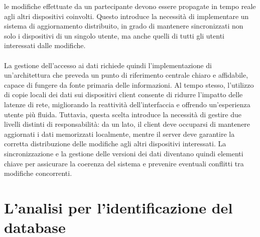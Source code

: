 le modifiche effettuate da un partecipante devono essere propagate
in tempo reale agli altri dispositivi coinvolti.
Questo introduce la necessità di implementare un sistema di aggiornamento distribuito,
in grado di mantenere sincronizzati non solo i dispositivi di un singolo utente,
ma anche quelli di tutti gli utenti interessati dalle modifiche.\\
\\
La gestione dell’accesso ai dati richiede quindi l’implementazione di un’architettura che preveda
un punto di riferimento centrale chiaro e affidabile,
capace di fungere da fonte primaria delle informazioni.
Al tempo stesso, l’utilizzo di copie locali dei dati sui dispositivi client
consente di ridurre l’impatto delle latenze di rete,
migliorando la reattività dell’interfaccia e offrendo un’esperienza utente più fluida.
Tuttavia, questa scelta introduce la necessità di gestire due livelli distinti di responsabilità:
da un lato, il client deve occuparsi di mantenere aggiornati i dati memorizzati localmente,
mentre il server deve garantire la corretta distribuzione delle modifiche agli altri dispositivi interessati.
La sincronizzazione e la gestione delle versioni dei dati diventano quindi
elementi chiave per assicurare la coerenza del sistema e
prevenire eventuali conflitti tra modifiche concorrenti.

\clearpage
\section{L'analisi per l'identificazione del database}


